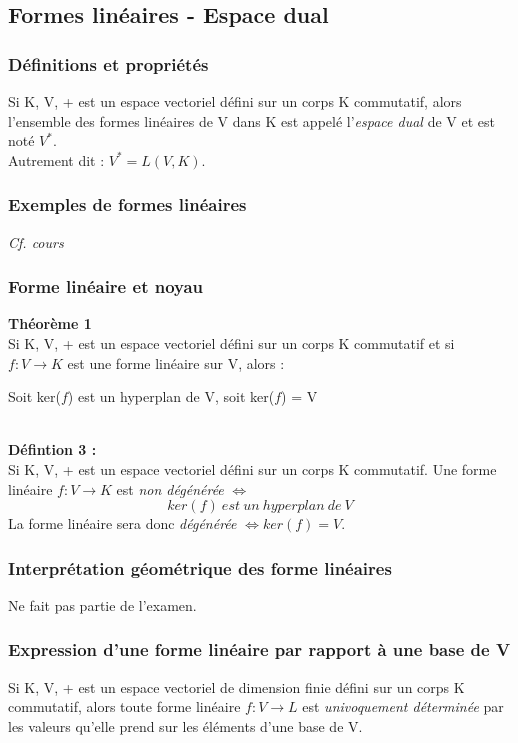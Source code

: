 \documentclass[12pt, a4paper, openany]{article}
\begin{document}
\subsection{Formes linéaires - Espace dual}
\subsubsection{Définitions et propriétés}
Si K, V, + est un espace vectoriel défini sur un corps K commutatif, alors l'ensemble des formes linéaires de V dans K est appelé l'\textit{espace dual} de V et est noté $V^{*}$.\\
Autrement dit : $V^* = L(V, K)$.

\subsubsection{Exemples de formes linéaires}
\textit{Cf. cours}

\subsubsection{Forme linéaire et noyau}
\textbf{Théorème 1}\\
Si K, V, + est un espace vectoriel défini sur un corps K commutatif et si $f : V \rightarrow K$ est une forme linéaire sur V, alors :
\begin{center}
Soit ker($f$) est un hyperplan de V, soit ker($f$) = V
\end{center}
\ \\
\textbf{Défintion 3 :}\\
Si K, V, + est un espace vectoriel défini sur un corps K commutatif. Une forme linéaire $f : V \rightarrow K$ est \textit{non dégénérée} $\Leftrightarrow$
$$ker(f)\ est\ un\ hyperplan\ de\ V$$
La forme linéaire sera donc \textit{dégénérée} $\Leftrightarrow ker(f) = V$.
\subsubsection{Interprétation géométrique des forme linéaires}
Ne fait pas partie de l'examen.

\subsubsection{Expression d'une forme linéaire par rapport à une base de V}
Si K, V, + est un espace vectoriel de dimension finie défini sur un corps K commutatif, alors toute forme linéaire $f : V \rightarrow L$ est \textit{univoquement déterminée} par les valeurs qu'elle prend sur les éléments d'une base de V.
\end{document}
